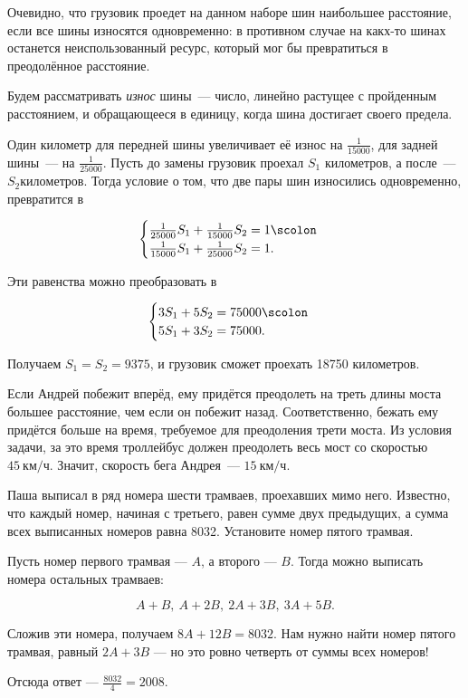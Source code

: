 \begin{itemize}

\itA Очевидно, что грузовик проедет на данном наборе шин наибольшее расстояние, если все шины износятся одновременно: в противном случае на какх-то шинах останется неиспользованный ресурс, который мог бы превратиться в преодолённое расстояние.

Будем рассматривать {\itshape износ} шины~— число, линейно растущее с пройденным расстоянием, и обращающееся в единицу, когда шина достигает своего предела.

Один километр для передней шины увеличивает её износ на $\tfrac{1}{15000}$, для задней шины~— на $\tfrac{1}{25000}$. Пусть до замены грузовик проехал $S_1$ километров, а после~— $S_2 километров$. Тогда условие о том, что две пары шин износились одновременно, превратится в

$$
\begin{cases}
	\frac{1}{25000}S_1 + \frac{1}{15000}S_2 = 1\scolon \\
	\frac{1}{15000}S_1 + \frac{1}{25000}S_2 = 1.
\end{cases}
$$

Эти равенства можно преобразовать в

$$
\begin{cases}
	3S_1 + 5S_2 = 75000\scolon \\
	5S_1 + 3S_2 = 75000.
\end{cases}
$$

Получаем $S_1 = S_2 = 9375$, и грузовик сможет проехать 18750 километров.


\itB Если Андрей побежит вперёд, ему придётся преодолеть на треть длины моста большее расстояние, чем если он побежит назад. Соответственно, бежать ему придётся больше на время, требуемое для преодоления трети моста. Из условия задачи, за это время троллейбус должен преодолеть весь мост со скоростью $\SI{45}{\text{км}/\text{ч}}$. Значит, скорость бега Андрея~— $\SI{15}{\text{км}/\text{ч}}$.

\itC Паша выписал в ряд номера шести трамваев, проехавших мимо него. Известно, что каждый номер, начиная с третьего, равен сумме двух предыдущих, а сумма всех выписанных номеров равна 8032. Установите номер пятого трамвая.

Пусть номер первого трамвая — $A$, а второго — $B$. Тогда можно выписать номера остальных трамваев:

$$A+B,\ A+2B,\ 2A+3B,\ 3A+5B.$$

Сложив эти номера, получаем $8A + 12B = 8032$. Нам нужно найти номер пятого трамвая, равный $2A+3B$ — но это ровно четверть от суммы всех номеров!

Отсюда ответ — $\tfrac{8032}{4} = 2008.$
\end{itemize}